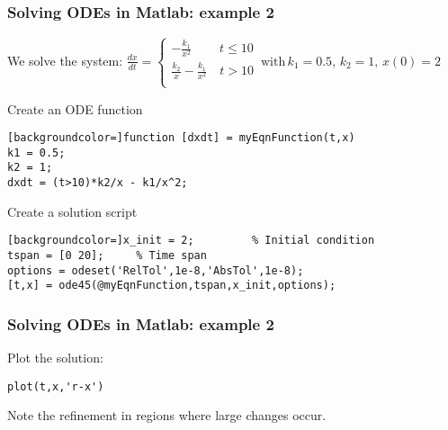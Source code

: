 \documentclass[11pt,table,final,fleqn,xcolor={usenames,dvipsnames,table}]{beamer}
\begin{document}
\begin{frame}[fragile]
  \frametitle{Solving ODEs in Matlab: example 2}
  We solve the system: $\displaystyle \frac{dx}{dt} = \begin{cases}
    -\frac{k_1}{x^2} \quad\ \quad t \leq 10\\
    \frac{k_2}{x} - \frac{k_1}{x^2} \quad  t > 10\\
 \end{cases}\, \mathrm{with}\, k_1 = 0.5,\, k_2 = 1,\, x(0) = 2$
 \vspace*{1ex}
  \begin{block}{Create an ODE function}
    \begin{lstlisting}[backgroundcolor=]function [dxdt] = myEqnFunction(t,x)
k1 = 0.5;
k2 = 1;
dxdt = (t>10)*k2/x - k1/x^2;
\end{lstlisting}
  \end{block}
  \pause
  \begin{block}{Create a solution script}
    \begin{lstlisting}[backgroundcolor=]x_init = 2;         % Initial condition
tspan = [0 20];     % Time span
options = odeset('RelTol',1e-8,'AbsTol',1e-8);
[t,x] = ode45(@myEqnFunction,tspan,x_init,options);\end{lstlisting}
  \end{block}
\vfill
\end{frame}

\begin{frame}[fragile]
  \frametitle{Solving ODEs in Matlab: example 2}
  Plot the solution:
  \begin{lstlisting}
plot(t,x,'r-x')
  \end{lstlisting}
  \pause
  \begin{center}
  \end{center}
  Note the refinement in regions where large changes occur.
\end{frame}
\end{document}
